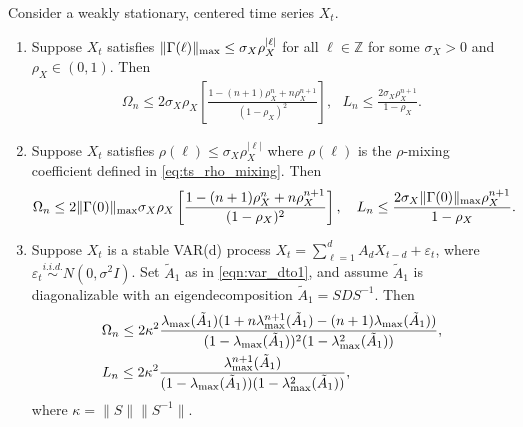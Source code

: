 \begin{prop}
\label{prop:order_bias}
Consider a weakly stationary,  centered time series $X_t$.  %
\begin{enumerate}
    \item \label{geo_decay} Suppose $X_t$ satisfies $\|\Gamma(\ell) \|_{\textup{max}} \le \sigma_X \rho_X^{|\ell|}$ for all $\ell \in \mathbb{Z}$ for some $\sigma_X > 0$ and  $\rho_X \in (0, 1)$. Then 
    \begin{equation}
    \begin{aligned}
     \Omega_n \le 2\sigma_X\rho_X\left[\frac{1-(n+1)\rho_X^n +n\rho_X^{n+1}}{(1-\rho_X)^2}\right],  ~~~ L_n\le \frac{2\sigma_X\rho_X^{n+1}}{1-\rho_X}. \nonumber
    \end{aligned}
    \end{equation}
    \item \label{rho-mixing} Suppose $X_t$ satisfies $\rho(\ell) \le \sigma_X \rho_X^{|\ell|}$ where $\rho({\ell})$ is the $\rho$-mixing coefficient defined in \eqref{eq:ts_rho_mixing}. Then 
     \begin{equation}
    \begin{aligned}
     \Omega_n \le 2\|\Gamma(0)\|_{\textup{max}}\sigma_X\rho_X\left[\frac{1-(n+1)\rho_X^n +n\rho_X^{n+1}}{(1-\rho_X)^2}\right],  ~~~ L_n\le \frac{2\sigma_X\|\Gamma(0)\|_{\textup{max}}\rho_X^{n+1}}{1-\rho_X}. \nonumber
    \end{aligned}
    \end{equation}
    \item \label{var-condition} Suppose $X_t$ is a stable VAR(d) process $X_t = \sum_{\ell=1}^d A_d  X_{t-d} + \varepsilon_t$, where $\varepsilon_t \stackrel{i.i.d.}{\sim} N(0, \sigma^2 I)$. Set $\tilde{A}_1$ as in \eqref{eqn:var_dto1}, and assume $\tilde{A}_1$ is diagonalizable with an eigendecomposition $\tilde{A}_1 = SDS^{-1}$. Then 
    \begin{equation}
    \begin{aligned}
    &\Omega_n \le 2\kappa^2\frac{\lambda_{\textup{max}}(\tilde{A}_1)(1+n\lambda_{\textup{max}}^{n+1}(\tilde{A}_1)-(n+1)\lambda_{\textup{max}}(\tilde{A}_1))}{(1-\lambda_{\textup{max}}(\tilde{A}_1))^2(1-\lambda^2_{\textup{max}}(\tilde{A}_1))}, \nonumber \\
    &L_n \le 2\kappa^2\frac{\lambda_{\textup{max}}^{n+1}(\tilde{A}_1)}{(1-\lambda_{\textup{max}}(\tilde{A}_1))(1-\lambda^2_{\textup{max}}(\tilde{A}_1))}, \nonumber
    \end{aligned}
    \end{equation}   
 where $\kappa = \|S\|\|S^{-1}\|$. 
\end{enumerate}
\end{prop}

